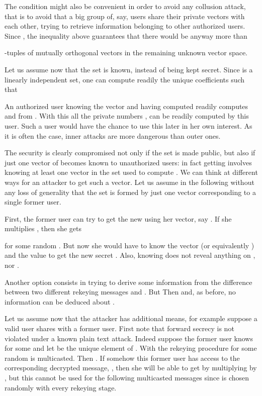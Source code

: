 \documentclass[a4paper,11pt]{amsart}
\theoremstyle{definition}
\begin{document}
\medskip 

The condition  might also be convenient in order to avoid any
collusion attack, that is to avoid that a big group of, say,  users
share their private vectors with each other, trying to retrieve
information belonging to other authorized users. Since ,
the inequality above guarantees that there would be anyway more than

-tuples of mutually orthogonal vectors in the remaining unknown
vector space.


Let us assume now that the set  is known, instead of being kept secret. Since 
is a linearly independent set, one can compute readily the unique
coefficients  such that

An authorized user knowing the vector 
and having computed  readily computes  and 
from . With this all the private numbers ,
 can be readily computed by this user. Such a user would
have the chance to use this later in her own interest. As it is often
the case, inner attacks are more dangerous than outer ones.

The security is clearly compromised not only if the set  is made
public, but also if just one vector of  becomes known to
unauthorized users: in fact getting  involves knowing at least one
vector in the set  used to compute . We can think at
different ways for an attacker to get such a vector. Let us assume in
the following without any loss of generality that the set 
is formed by just one vector corresponding to a single former user.




First, the former user can try to get the new  using her vector,
say . If she multiplies ,
then she gets

\noindent for some random . But now she would have to know the
vector  (or equivalently ) and the value 
to get the new secret
. Also, knowing  does not reveal anything on , nor
.


Another option consists in trying to derive some information from the
difference between two different rekeying messages  and
. But
 Then  and, as before, no information can be deduced about
.



Let us assume now that the attacker has additional means, for example
suppose a valid user shares  with a former user. 
First note that 
forward secrecy is not violated under a known plain text attack.
Indeed
suppose the former user knows  for some  and let 
be the unique element of . With the rekeying procedure
 for some random  is multicasted. Then
.  If
somehow this former user has access to the corresponding decrypted
message, , then she will be able to get  by multiplying by , but this cannot be used for
the following multicasted messages since  is chosen randomly with
every rekeying stage. 
\end{document}
